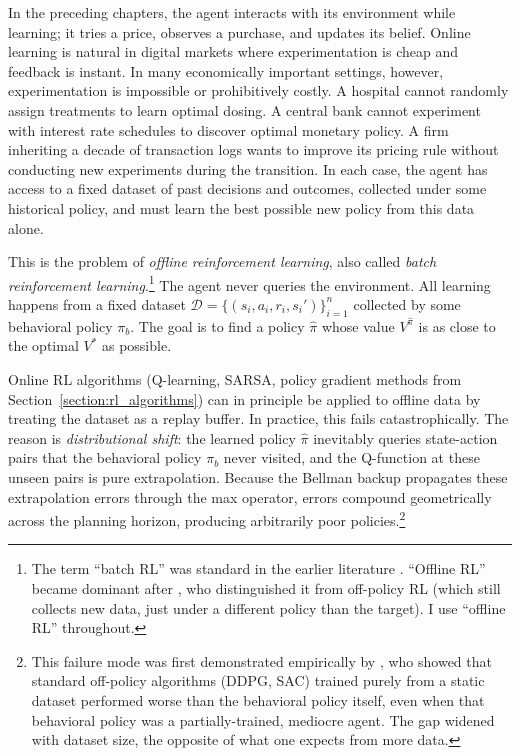 In the preceding chapters, the agent interacts with its environment while learning; it tries a price, observes a purchase, and updates its belief. Online learning is natural in digital markets where experimentation is cheap and feedback is instant. In many economically important settings, however, experimentation is impossible or prohibitively costly. A hospital cannot randomly assign treatments to learn optimal dosing. A central bank cannot experiment with interest rate schedules to discover optimal monetary policy. A firm inheriting a decade of transaction logs wants to improve its pricing rule without conducting new experiments during the transition. In each case, the agent has access to a fixed dataset of past decisions and outcomes, collected under some historical policy, and must learn the best possible new policy from this data alone.

This is the problem of \textit{offline reinforcement learning}, also called \textit{batch reinforcement learning}.\footnote{The term ``batch RL'' was standard in the earlier literature \citep{Ernst2005, Lange2012}. ``Offline RL'' became dominant after \citet{Levine2020}, who distinguished it from off-policy RL (which still collects new data, just under a different policy than the target). I use ``offline RL'' throughout.} The agent never queries the environment. All learning happens from a fixed dataset $\mathcal{D} = \{(s_i, a_i, r_i, s_i')\}_{i=1}^n$ collected by some behavioral policy $\pi_b$. The goal is to find a policy $\hat{\pi}$ whose value $V^{\hat{\pi}}$ is as close to the optimal $V^*$ as possible.

Online RL algorithms (Q-learning, SARSA, policy gradient methods from Section~\ref{section:rl_algorithms}) can in principle be applied to offline data by treating the dataset as a replay buffer. In practice, this fails catastrophically. The reason is \textit{distributional shift}: the learned policy $\hat{\pi}$ inevitably queries state-action pairs that the behavioral policy $\pi_b$ never visited, and the Q-function at these unseen pairs is pure extrapolation. Because the Bellman backup propagates these extrapolation errors through the max operator, errors compound geometrically across the planning horizon, producing arbitrarily poor policies.\footnote{This failure mode was first demonstrated empirically by \citet{Fujimoto2019}, who showed that standard off-policy algorithms (DDPG, SAC) trained purely from a static dataset performed worse than the behavioral policy itself, even when that behavioral policy was a partially-trained, mediocre agent. The gap widened with dataset size, the opposite of what one expects from more data.}

